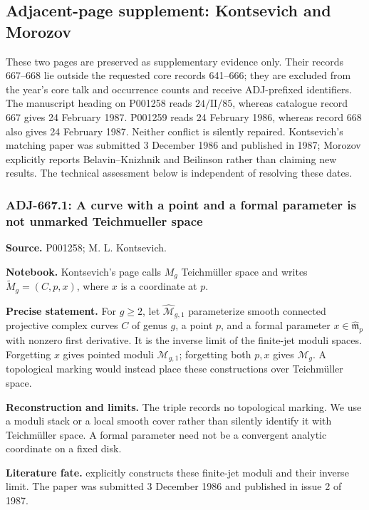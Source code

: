 \subsection{Adjacent-page supplement: Kontsevich and Morozov}
\label{supp:1985-adjacent}
These two pages are preserved as supplementary evidence only. Their records
667--668 lie outside the requested core records 641--666; they are excluded
from the year's core talk and occurrence counts and receive ADJ-prefixed
identifiers. The manuscript heading on P001258 reads \(24/\mathrm{II}/85\),
whereas catalogue record 667 gives 24 February 1987. P001259 reads
24 February 1986, whereas record 668 also gives 24 February 1987.
Neither conflict is silently repaired. Kontsevich's matching paper was
submitted 3 December 1986 and published in 1987; Morozov explicitly reports
Belavin--Knizhnik and Beilinson rather than claiming new results. The technical
assessment below is independent of resolving these dates.

\subsubsection{ADJ-667.1: A curve with a point and a formal parameter is not unmarked Teichmueller space}
\noindent\textbf{Source.} P001258; M. L. Kontsevich.\par
\noindent\textbf{Notebook.} Kontsevich's page calls \(M_g\) Teichm\"uller space and writes \(\widetilde M_g=(C,p,x)\), where \(x\) is a coordinate at \(p\).\par

\noindent\textbf{Precise statement.} For \(g\ge2\), let \(\widehat{\mathcal M}_{g,1}\) parameterize smooth connected projective complex curves \(C\) of genus \(g\), a point \(p\), and a formal parameter \(x\in\widehat{\mathfrak m}_p\) with nonzero first derivative. It is the inverse limit of the finite-jet moduli spaces. Forgetting \(x\) gives pointed moduli \(\mathcal M_{g,1}\); forgetting both \(p,x\) gives \(\mathcal M_g\). A topological marking would instead place these constructions over Teichm\"uller space.\par

\noindent\textbf{Reconstruction and limits.} The triple records no topological marking. We use a moduli stack or a local smooth cover rather than silently identify it with Teichm\"uller space. A formal parameter need not be a convergent analytic coordinate on a fixed disk.\par

\noindent\textbf{Literature fate.} \citet[\S1]{kontsevich1987virasoro} explicitly constructs these finite-jet moduli and their inverse limit. The paper was submitted 3 December 1986 and published in issue 2 of 1987.\par

